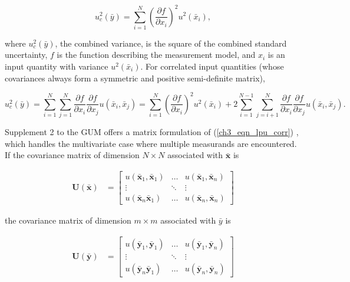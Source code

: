 \documentclass[../thesis/thesis.tex]{subfiles}
\begin{document}
\begin{equation}
u^2_c(\bar{y}) = \sum_{i=1}^{N}(\frac{\partial f}{\partial x_i})^2 u^2(\bar{x}_i),
\end{equation}

where $u^2_c(\bar{y})$, the combined variance, is the square of the combined standard uncertainty, $f$ is the function describing the measurement model, and $x_i$ is an input quantity with variance $u^2(\bar{x}_i)$. For correlated input quantities (whose covariances always form a symmetric and positive semi-definite matrix),

\begin{equation}
u^2_c(\bar{y}) = \sum_{i=1}^{N}\sum_{j=1}^{N} \frac{\partial f}{\partial x_i}\frac{\partial f}{\partial x_j} u(\bar{x}_i,\bar{x}_j) = \sum_{i=1}^{N}(\frac{\partial f}{\partial x_i})^2 u^2(\bar{x}_i) + 2\sum_{i=1}^{N-1}\sum_{j=i+1}^{N} \frac{\partial f}{\partial x_i}\frac{\partial f}{\partial x_j} u(\bar{x}_i,\bar{x}_j).
\label{ch3_eqn_lpu_corr}
\end{equation}

Supplement 2 to the GUM offers a matrix formulation of (\ref{ch3_eqn_lpu_corr}) \cite[6.2.1.3]{GUM_S2}, which handles the multivariate case where multiple measurands are encountered. If the covariance matrix of dimension $N \times N$ associated with $\bar{\bm{x}}$ is

\begin{align}
\boldsymbol U(\bar{\boldsymbol x}) & = 
\begin{bmatrix}
u{(\bar{\boldsymbol x}_1,\bar{\boldsymbol x}_1)}&\dots&u(\bar{\boldsymbol x}_1,\bar{\boldsymbol x}_n)\\
\vdots&\ddots&\vdots\\
u(\bar{\boldsymbol x}_n\bar{\boldsymbol x}_1)&\dots&u{(\bar{\boldsymbol x}_n,\bar{\boldsymbol x}_n)}
\end{bmatrix}
\end{align}

the covariance matrix of dimension $m \times m$ associated with $\bar y$ is

\begin{align}
\boldsymbol U(\bar{\boldsymbol y}) & = 
\begin{bmatrix}
u{(\bar{\boldsymbol y}_1,\bar{\boldsymbol y}_1)}&\dots&u(\bar{\boldsymbol y}_1,\bar{\boldsymbol y}_n)\\
\vdots&\ddots&\vdots\\
u(\bar{\boldsymbol y}_n\bar{\boldsymbol y}_1)&\dots&u{(\bar{\boldsymbol y}_n,\bar{\boldsymbol y}_n)}
\end{bmatrix}
\end{align}
\end{document}
